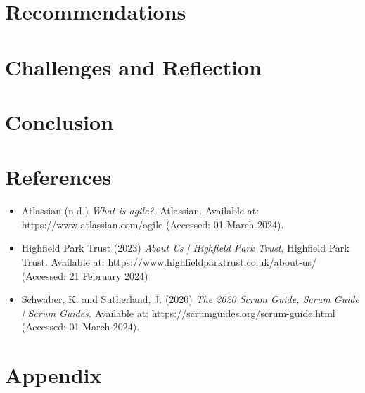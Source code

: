 \documentclass[12pt]{report}
\begin{document}
\section{Recommendations}

\section{Challenges and Reflection}

\section{Conclusion}

\section{References}

\begin{itemize}
    \item Atlassian (n.d.) \textit{What is agile?}, Atlassian. Available at:
      https://www.atlassian.com/agile (Accessed: 01 March 2024).
    \item Highfield Park Trust (2023) \textit{About Us | Highfield Park Trust},
      Highfield Park Trust. Available at:
      https://www.highfieldparktrust.co.uk/about-us/ (Accessed: 21 February
      2024)
    \item Schwaber, K. and Sutherland, J. (2020) \textit{The 2020 Scrum Guide,
      Scrum Guide | Scrum Guides.} Available at:
      https://scrumguides.org/scrum-guide.html (Accessed: 01 March 2024).
\end{itemize}

\section{Appendix} %
\end{document}
